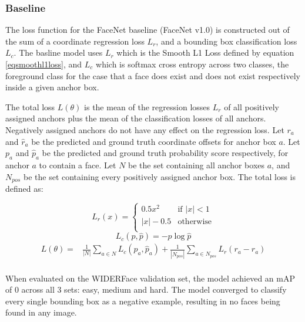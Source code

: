 \documentclass[paperwidth=48in,paperheight=48in, fontscale=0.4166666666666, landscape]{baposter}
\begin{document}
\begin{poster}
{\subsubsection{Baseline}
The loss function for the FaceNet baseline (FaceNet v1.0) is constructed out of the sum of a coordinate regression loss $L_r$, and a bounding box classification loss $L_c$. The basline model uses $L_r$ which is the Smooth L1 Loss \cite{cs231n} defined by equation \eqref{eqsmoothl1loss}, and $L_c$ which is softmax cross entropy across two classes, the foreground class for the case that a face does exist and does not exist respectively inside a given anchor box.

The total loss $L(\theta)$ is the mean of the regression losses $L_r$ of all positively assigned anchors plus the mean of the classification losses of all anchors. Negatively assigned anchors do not have any effect on the regression loss. Let $r_a$ and $\hat{r}_a$ be the predicted and ground truth coordinate offsets for anchor box $a$. Let $p_a$ and $\hat{p}_a$ be the predicted and ground truth probability score respectively, for anchor $a$ to contain a face. Let $N$ be the set containing all anchor boxes $a$, and $N_{pos}$ be the set containing every positively assigned anchor box. The total loss is defined as:

\begin{equation}\label{eqfacenetsoftmax}
L_r(x) = \begin{cases}
				0.5x^2 & \mbox{if } |x| < 1\\
				|x| - 0.5 & \mbox{otherwise}\\
			\end{cases}
\end{equation}
\begin{equation}\label{eqsmoothl1loss}
L_c(p, \hat{p}) = -p \log{\hat{p}}
\end{equation}
\begin{equation}
\begin{split}
	L(\theta) = &  \frac{1}{|N|} \sum_{a \in N} L_c(p_a, \hat{p}_a) 
	 + \frac{1}{|N_{pos}|} \sum_{a \in N_{pos}} L_r(r_a - \hat{r}_a)  \\ 
\end{split}
\end{equation}

When evaluated on the WIDERFace validation set, the model achieved an mAP of 0 across all 3 sets: easy, medium and hard. The model converged to classify every single bounding box as a negative example, resulting in no faces being found in any image.

}
\end{poster}
\end{document}
